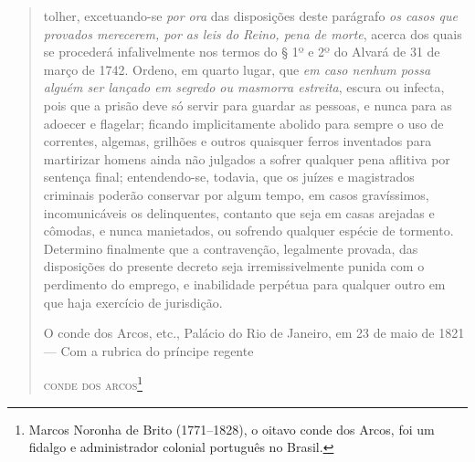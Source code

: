 \begin{quote}
{tolher}, excetuando-se \emph{por ora} das disposições deste parágrafo
\emph{os casos que provados merecerem, por as leis do Reino, pena de
morte}, acerca dos quais se procederá infalivelmente nos termos do § 1º
e 2º do Alvará de 31 de março de 1742. Ordeno, em quarto lugar, que
\emph{em caso nenhum possa alguém ser lançado em segredo ou masmorra
estreita}, escura ou infecta, pois que a prisão deve só servir para
guardar as pessoas, e nunca para as adoecer e flagelar; ficando
implicitamente abolido para sempre o uso de correntes, algemas, grilhões
e outros quaisquer ferros inventados para martirizar homens ainda não
julgados a sofrer qualquer pena aflitiva por sentença final;
entendendo-se, todavia, que os juízes e magistrados criminais poderão
conservar por algum tempo, em casos gravíssimos, incomunicáveis os
delinquentes, contanto que seja em casas arejadas e cômodas, e nunca
manietados, ou sofrendo qualquer espécie de tormento. Determino
finalmente que a contravenção, legalmente provada, das disposições do
presente decreto seja irremissivelmente punida com o perdimento do
emprego, e inabilidade perpétua para qualquer outro em que haja
exercício de jurisdição.\medskip

\hfill\parbox{220pt}{O conde dos Arcos, etc., Palácio do Rio de Janeiro, em 23 de maio de
1821 --- Com a rubrica do príncipe regente}

\hfill\textsc{conde dos arcos}\footnote{Marcos Noronha de Brito (1771--1828), o
  oitavo conde dos Arcos, foi um fidalgo e administrador colonial
  português no Brasil.}
\end{quote}

